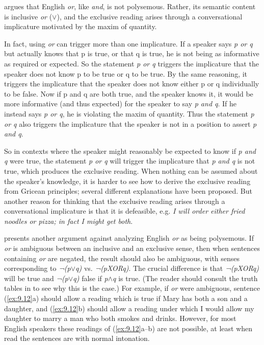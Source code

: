 \citet{Grice1978} argues that English \textit{or}, like \textit{and}, is not polysemous. Rather, its semantic content is inclusive \textit{or} ($\vee$), and the exclusive reading arises through a conversational implicature motivated by the maxim of quantity.



In fact, using \textit{or} can trigger more than one implicature. If a speaker says \textit{p or q} but actually knows that p is true, or that q is true, he is not being as informative as required or expected. So the statement \textit{p or q} triggers the implicature that the speaker does not know p to be true or q to be true. By the same reasoning, it triggers the implicature that the speaker does not know either p or q individually to be false. Now if p and q are both true, and the speaker knows it, it would be more informative (and thus expected) for the speaker to say \textit{p and q}. If he instead says \textit{p or q}, he is violating the maxim of quantity. Thus the statement \textit{p or q} also triggers the implicature that the speaker is not in a position to assert \textit{p and q}.



So in contexts where the speaker might reasonably be expected to know if \textit{p and q} were true, the statement \textit{p or q} will trigger the implicature that \textit{p and q} is not true, which produces the exclusive reading. When nothing can be assumed about the speaker’s knowledge, it is harder to see how to derive the exclusive reading from Gricean principles; several different explanations have been proposed. But another reason for thinking that the exclusive reading arises through a conversational implicature is that it is defeasible, e.g. \textit{I will order either fried noodles or pizza; in fact I might get both}.



\citet[81--82]{Gazdar1979} presents another argument against analyzing English \textit{or} as being polysemous. If \textit{or} is ambiguous between an inclusive and an exclusive sense, then when sentences containing \textit{or} are negated, the result should also be ambiguous, with senses corresponding to \textit{¬(p$\vee$q)} vs. \textit{¬(pXORq)}. The crucial difference is that \textit{¬(pXORq)} will be true and \textit{¬(p$\vee$q)} false if \textit{p$\wedge$q} is true. (The reader should consult the truth tables in  to see why this is the case.) For example, if \textit{or} were ambiguous, sentence (\ref{ex:9.12}a) should allow a reading which is true if Mary has both a son and a daughter, and (\ref{ex:9.12}b) should allow a reading under which I would allow my daughter to marry a man who both smokes and drinks. However, for most English speakers these readings of (\ref{ex:9.12}a--b) are not possible, at least when read the sentences are with normal intonation.

